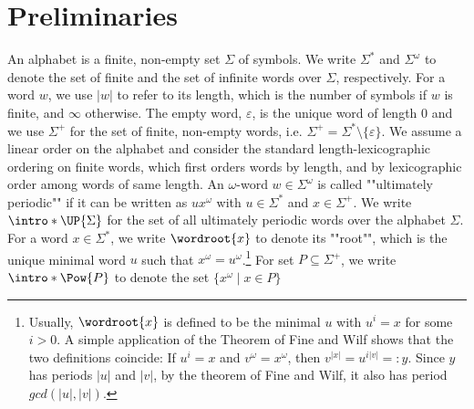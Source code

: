 \documentclass[a4paper,USenglish,cleveref,autoref,thm-restate]{lipics-v2021}
\newcommand{\eps}{\ensuremath{\varepsilon}}
\begin{document}
 \section{Preliminaries}
\label{section:preliminaries}
An alphabet is a finite, non-empty set $\Sigma$ of symbols.
We write $\Sigma^*$ and $\Sigma^\omega$ to denote the set of finite and the set of infinite words over $\Sigma$, respectively. 
For a word $w$, we use $|w|$ to refer to its length, which is the number of symbols if $w$ is finite, and $\infty$ otherwise.
The empty word, $\eps$, is the unique word of length $0$ and we use $\Sigma^+$ for the set of finite, non-empty words, i.e. $\Sigma^+ = \Sigma^* \setminus \{\eps\}$. We assume a linear order on the alphabet and consider the standard length-lexicographic ordering on finite words, which first orders words by length, and by lexicographic order among words of same length.
\AP
An $\omega$-word $w \in \Sigma^\omega$ is called ""ultimately periodic"" if it can be written as $ux^\omega$ with $u \in \Sigma^*$ and $x \in \Sigma^+$.
We write $\intro*\UP{\Sigma}$ for the set of all ultimately periodic words over the alphabet $\Sigma$.
\AP
For a word $x \in \Sigma^*$, we write $\wordroot{x}$ to denote its ""root"", which is the unique minimal word $u$ such that $x^\omega = u^\omega$.\footnote{Usually, $\wordroot{x}$ is defined to be the minimal $u$ with $u^i = x$ for some $i > 0$. A simple application of the Theorem of Fine and Wilf shows that the two definitions coincide: If $u^i = x$ and $v^\omega = x^\omega$, then $v^{|x|} = u^{i|v|} =: y$. Since $y$ has periods $|u|$ and $|v|$, by the theorem of Fine and Wilf, it also has period $gcd(|u|,|v|)$.}
\AP
For set $P \subseteq \Sigma^+$, we write $\intro*\Pow{P}$ to denote the set $\{x^\omega \mid x \in P\}$
\end{document}
